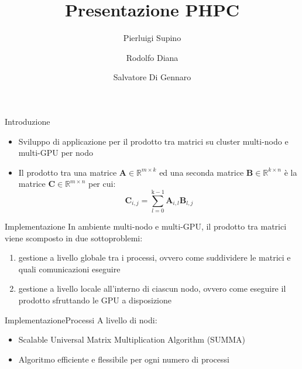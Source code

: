 \documentclass{beamer}
\title{Presentazione PHPC}
\author{Pierluigi Supino \and Rodolfo Diana \and Salvatore Di Gennaro}
\begin{document}
\begin{frame}
    \titlepage
\end{frame}

\begin{frame}{Introduzione}
    \begin{itemize}
        \item Sviluppo di applicazione per il prodotto tra matrici su cluster multi-nodo e multi-GPU per nodo
        \item Il prodotto tra una matrice $\mathbf{A} \in \mathbb{R}^{m\times{k}}$ ed una seconda matrice $\mathbf{B} \in \mathbb{R}^{k\times{n}}$ è la matrice $\mathbf{C} \in \mathbb{R}^{m\times{n}}$ per cui: $$ \mathbf{C}_{i,j} = \sum_{l=0}^{\text{k}-1} \mathbf{A}_{i, l} \mathbf{B}_{l, j} $$
    \end{itemize}
\end{frame}

\begin{frame}{Implementazione}
    In ambiente multi-nodo e multi-GPU, il prodotto tra matrici viene scomposto in due sottoproblemi:
    \begin{enumerate}
        \item gestione a livello globale tra i processi, ovvero come suddividere le matrici e quali comunicazioni eseguire
        \item gestione a livello locale all'interno di ciascun nodo, ovvero come eseguire il prodotto sfruttando le GPU a disposizione
    \end{enumerate}
\end{frame}

\begin{frame}{Implementazione}{Processi}
    A livello di nodi:
    \begin{itemize}
        \item Scalable Universal Matrix Multiplication Algorithm (SUMMA)
        \item Algoritmo efficiente e flessibile per ogni numero di processi
    \end{itemize}
\end{frame}
\end{document}
